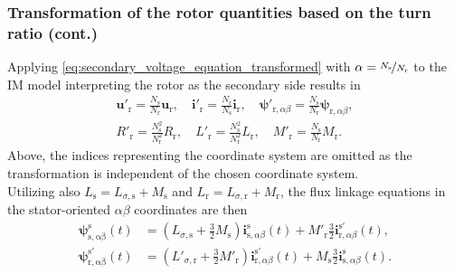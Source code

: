 \begin{frame}
	\frametitle{Transformation of the rotor quantities based on the turn ratio (cont.)}
	\onslide<+->
	Applying \eqref{eq:secondary_voltage_equation_transformed} with $\alpha=\nicefrac{N_\mathrm{s}}{N_\mathrm{r}}$ to the IM model  interpreting the rotor as the secondary side results in
	\begin{equation}
		\begin{gathered}
			\bm{u}'_{\mathrm{r}} = \frac{N_\mathrm{s}}{N_\mathrm{r}}\bm{u}_{\mathrm{r}}, \quad \bm{i}'_{\mathrm{r}} = \frac{N_\mathrm{r}}{N_\mathrm{s}}\bm{i}_{\mathrm{r}}, \quad \bm{\psi}'_{\mathrm{r},\alpha\beta} = \frac{N_\mathrm{s}}{N_\mathrm{r}}\bm{\psi}_{\mathrm{r},\alpha\beta},\\
			R'_\mathrm{r} =  \frac{N_\mathrm{s}^2}{N_\mathrm{r}^2} R_\mathrm{r}, \quad L'_\mathrm{r} =  \frac{N_\mathrm{s}^2}{N_\mathrm{r}^2} L_\mathrm{r}, \quad M'_\mathrm{r} =  \frac{N_\mathrm{s}}{N_\mathrm{r}} M_\mathrm{r}.
		\end{gathered}
	\end{equation}
	\onslide<+->
	Above, the indices representing the coordinate system are omitted as the transformation is independent of the chosen coordinate system.
	\\[0.5em]
	\onslide<+->
	Utilizing also $L_\mathrm{s} = L_{\sigma,\mathrm{s}} + M_\mathrm{s}$ and $L_\mathrm{r} = L_{\sigma,\mathrm{r}} + M_\mathrm{r}$, the flux linkage equations in the stator-oriented $\alpha\beta$ coordinates are then
	\begin{align*}
		\bm{\psi}^\mathrm{s}_\mathrm{s,\alpha\beta}(t)    & = (L_{\sigma,\mathrm{s}} +\frac{3}{2}M_\mathrm{s}) \bm{i}^\mathrm{s}_{\mathrm{s},\alpha\beta}(t) +  M'_{\mathrm{r}}\frac{3}{2} \bm{i}^{\mathrm{s}'}_{\mathrm{r},\alpha\beta}(t),   \\
		\bm{\psi}^{\mathrm{s}'}_\mathrm{r,\alpha\beta}(t) & = (L'_{\sigma,\mathrm{r}} + \frac{3}{2}M'_\mathrm{r}) \bm{i}^{\mathrm{s}'}_{\mathrm{r},\alpha\beta}(t) +  M_{\mathrm{s}}\frac{3}{2} \bm{i}^\mathrm{s}_{\mathrm{s},\alpha\beta}(t).
	\end{align*}
\end{frame}

